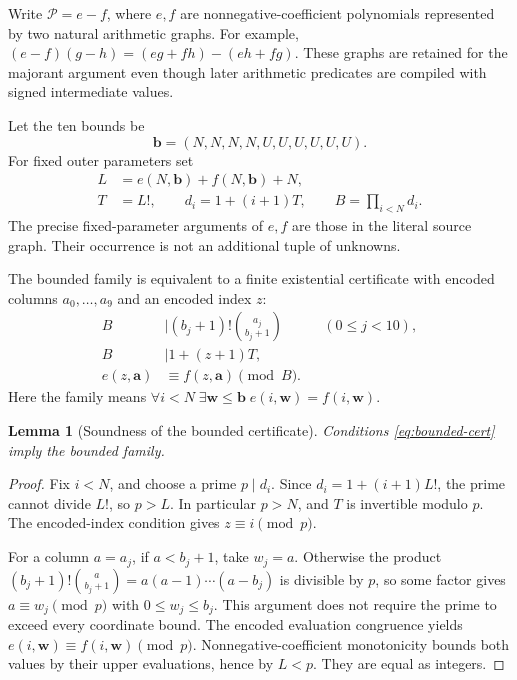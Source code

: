 \documentclass[11pt,a4paper]{article}
\newtheorem{lemma}[theorem]{Lemma}
\theoremstyle{definition}\newtheorem{definition}[theorem]{Definition}
\theoremstyle{remark}\newtheorem{remark}[theorem]{Remark}
\numberwithin{equation}{section}
\begin{document}
Write \(\mathcal P=e-f\), where \(e,f\) are nonnegative-coefficient
polynomials represented by two natural arithmetic graphs. For example,
\((e-f)(g-h)=(eg+fh)-(eh+fg)\). These graphs are retained for the
majorant argument even though later arithmetic predicates are compiled
with signed intermediate values.

Let the ten bounds be
\[
 \boldsymbol b=(N,N,N,N,U,U,U,U,U,U).
\]
For fixed outer parameters set
\begin{align}
 L&=e(N,\boldsymbol b)+f(N,\boldsymbol b)+N,\nonumber\\
 T&=L!,\qquad d_i=1+(i+1)T,\qquad
 B=\prod_{i<N}d_i.
\label{eq:crt-product}
\end{align}
The precise fixed-parameter arguments of \(e,f\) are those in the
literal source graph. Their occurrence is not an additional tuple of
unknowns.

The bounded family is equivalent to a finite existential certificate
with encoded columns \(a_0,\ldots,a_9\) and an encoded index \(z\):
\begin{align}
 B&\mid (b_j+1)!\binom{a_j}{b_j+1} &&(0\le j<10),\nonumber\\
 B&\mid 1+(z+1)T,\nonumber\\
 e(z,\boldsymbol a)&\equiv f(z,\boldsymbol a)\pmod B.
\label{eq:bounded-cert}
\end{align}
Here the family means \(\forall i<N\;\exists\boldsymbol w\le
\boldsymbol b\;e(i,\boldsymbol w)=f(i,\boldsymbol w)\).

\begin{lemma}[Soundness of the bounded certificate]
Conditions \eqref{eq:bounded-cert} imply the bounded family.
\end{lemma}
\begin{proof}
Fix \(i<N\), and choose a prime \(p\mid d_i\). Since
\(d_i=1+(i+1)L!\), the prime cannot divide \(L!\), so \(p>L\).
In particular \(p>N\), and \(T\) is invertible modulo \(p\).
The encoded-index condition gives \(z\equiv i\pmod p\).

For a column \(a=a_j\), if \(a<b_j+1\), take \(w_j=a\).
Otherwise the product
\((b_j+1)!\binom a{b_j+1}=a(a-1)\cdots(a-b_j)\)
is divisible by \(p\), so some factor gives
\(a\equiv w_j\pmod p\) with \(0\le w_j\le b_j\).
This argument does not require the prime to exceed every coordinate
bound. The encoded evaluation congruence yields
\(e(i,\boldsymbol w)\equiv f(i,\boldsymbol w)\pmod p\).
Nonnegative-coefficient monotonicity bounds both values by their upper
evaluations, hence by \(L<p\). They are equal as integers.
\end{proof}
\end{document}
